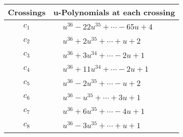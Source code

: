 \documentclass[1p]{elsarticle_modified}
\theoremstyle{definition}
\begin{document}
\begin{tabular}{m{50pt}|m{274pt}}
Crossings & \hspace{64pt}u-Polynomials at each crossing \\
\hline $$\begin{aligned}c_{1}\end{aligned}$$&$\begin{aligned}
&u^{36}-22 u^{35}+\cdots-65 u+4
\end{aligned}$\\
\hline $$\begin{aligned}c_{2}\end{aligned}$$&$\begin{aligned}
&u^{36}+2 u^{35}+\cdots+u+2
\end{aligned}$\\
\hline $$\begin{aligned}c_{3}\end{aligned}$$&$\begin{aligned}
&u^{36}+3 u^{34}+\cdots-2 u+1
\end{aligned}$\\
\hline $$\begin{aligned}c_{4}\end{aligned}$$&$\begin{aligned}
&u^{36}+11 u^{34}+\cdots-2 u+1
\end{aligned}$\\
\hline $$\begin{aligned}c_{5}\end{aligned}$$&$\begin{aligned}
&u^{36}-2 u^{35}+\cdots- u+2
\end{aligned}$\\
\hline $$\begin{aligned}c_{6}\end{aligned}$$&$\begin{aligned}
&u^{36}- u^{35}+\cdots+3 u+1
\end{aligned}$\\
\hline $$\begin{aligned}c_{7}\end{aligned}$$&$\begin{aligned}
&u^{36}+6 u^{35}+\cdots-4 u+1
\end{aligned}$\\
\hline $$\begin{aligned}c_{8}\end{aligned}$$&$\begin{aligned}
&u^{36}-3 u^{35}+\cdots+u+1
\end{aligned}$\\

\end{tabular}
\end{document}
